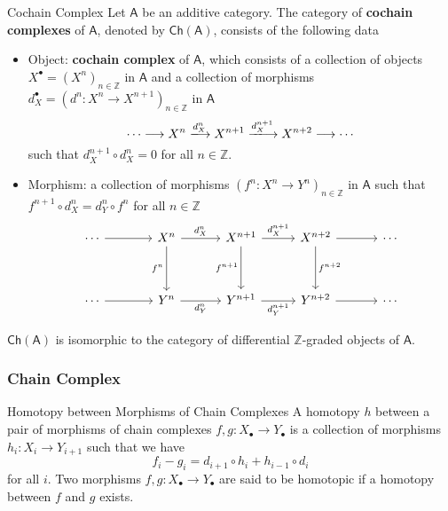 \begin{definition}{Cochain Complex}{}
    Let $\mathsf{A}$ be an additive category. The category of \textbf{cochain complexes} of $\mathsf{A}$, denoted by $\mathsf{Ch}(\mathsf{A})$, consists of the following data
    \begin{itemize}
        \item Object: \textbf{cochain complex} of $\mathsf{A}$, which consists of a collection of objects $X^{\bullet}=\left(X^n\right)_{n\in \mathbb{Z}}$ in $\mathsf{A}$ and a collection of morphisms $d_X^{\bullet}=\left(d^n:X^n\to X^{n+1}\right)_{n\in \mathbb{Z}}$ in $\mathsf{A}$ 
        \[
            \cdots \longrightarrow X^n \xlongrightarrow{d^n_X} X^{n+1} \xlongrightarrow{d^{n+1}_X} X^{n+2} \longrightarrow \cdots
        \]
        such that $d^{n+1}_X\circ d^n_X=0$ for all $n\in \mathbb{Z}$.
        \item Morphism: a collection of morphisms $\left(f^n:X^n\to Y^{n}\right)_{n\in \mathbb{Z}}$ in $\mathsf{A}$ such that $f^{n+1}\circ d^n_X=d^n_Y\circ f^n$ for all $n\in \mathbb{Z}$
        \[
            \begin{tikzcd}[
                ampersand replacement=\&,
                column sep={6em, between origins},
                row sep={5em, between origins}
            ]
                \cdots \arrow[r] \& X^{n} \arrow[r, "d_X^n"] \arrow[d, "f^n"'] \& X^{n+1} \arrow[d, "f^{n+1}"'] \arrow[r, "d_X^{n+1}"] \& X^{n+2} \arrow[d, "f^{n+2}"] \arrow[r] \& \cdots \\
                \cdots \arrow[r] \& Y^{n} \arrow[r, "d_Y^{n}"'] \& Y^{n+1} \arrow[r, "d_Y^{n+1}"'] \& Y^{n+2} \arrow[r] \& \cdots
            \end{tikzcd}
        \]
    \end{itemize}
    $\mathsf{Ch}(\mathsf{A})$ is isomorphic to the category of differential $\mathbb{Z}$-graded objects of $\mathsf{A}$.
\end{definition}


\subsubsection{Chain Complex}
\begin{definition}{Homotopy between Morphisms of Chain Complexes}{}
    A homotopy $h$ between a pair of morphisms of chain complexes $f, g: X_{\bullet} \rightarrow Y_{\bullet}$ is a collection of morphisms $h_i: X_i \rightarrow Y_{i+1}$ such that we have
$$
f_i-g_i=d_{i+1} \circ h_i+h_{i-1} \circ d_i
$$
for all $i$. Two morphisms $f, g: X_{\bullet} \rightarrow Y_{\bullet}$ are said to be homotopic if a homotopy between $f$ and $g$ exists. 
\end{definition}

